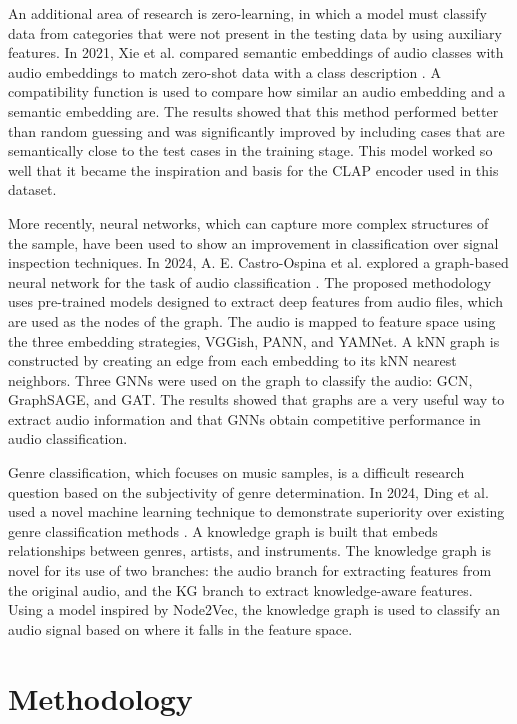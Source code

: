 \documentclass{article}
\begin{document}
An additional area of research is zero-learning, in which a model must classify data from categories that were not present in the testing data by using auxiliary features. In 2021, Xie et al. compared semantic embeddings of audio classes with audio embeddings to match zero-shot data with a class description \cite{Xie}. A compatibility function is used to compare how similar an audio embedding and a semantic embedding are. The results showed that this method performed better than random guessing and was significantly improved by including cases that are semantically close to the test cases in the training stage. This model worked so well that it became the inspiration and basis for the CLAP encoder used in this dataset.

More recently, neural networks, which can capture more complex structures of the sample, have been used to show an improvement in classification over signal inspection techniques. In 2024, A. E. Castro-Ospina et al. explored a graph-based neural network for the task of audio classification \cite{castro-ospina}. The proposed methodology uses pre-trained models designed to extract deep features from audio files, which are used as the nodes of the graph. The audio is mapped to feature space using the three embedding strategies, VGGish, PANN, and YAMNet. A kNN graph is constructed by creating an edge from each embedding to its kNN nearest neighbors. Three GNNs were used on the graph to classify the audio: GCN, GraphSAGE, and GAT. The results showed that graphs are a very useful way to extract audio information and that GNNs obtain competitive performance in audio classification.

Genre classification, which focuses on music samples, is a difficult research question based on the subjectivity of genre determination. In 2024, Ding et al. used a novel machine learning technique to demonstrate superiority over existing genre classification methods \cite{ding}. A knowledge graph is built that embeds relationships between genres, artists, and instruments. The knowledge graph is novel for its use of two branches: the audio branch for extracting features from the original audio, and the KG branch to extract knowledge-aware features. Using a model inspired by Node2Vec, the knowledge graph is used to classify an audio signal based on where it falls in the feature space.

\section{Methodology}
\end{document}
